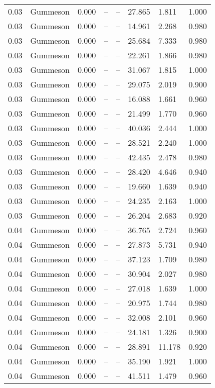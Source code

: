 \begin{table}[H]
\begin{tabular}{l c l l l}
0.03 & Gummeson & 0.000 & -- & -- & 27.865 & 1.811 & 1.000 \\
0.03 & Gummeson & 0.000 & -- & -- & 14.961 & 2.268 & 0.980 \\
0.03 & Gummeson & 0.000 & -- & -- & 25.684 & 7.333 & 0.980 \\
0.03 & Gummeson & 0.000 & -- & -- & 22.261 & 1.866 & 0.980 \\
0.03 & Gummeson & 0.000 & -- & -- & 31.067 & 1.815 & 1.000 \\
0.03 & Gummeson & 0.000 & -- & -- & 29.075 & 2.019 & 0.900 \\
0.03 & Gummeson & 0.000 & -- & -- & 16.088 & 1.661 & 0.960 \\
0.03 & Gummeson & 0.000 & -- & -- & 21.499 & 1.770 & 0.960 \\
0.03 & Gummeson & 0.000 & -- & -- & 40.036 & 2.444 & 1.000 \\
0.03 & Gummeson & 0.000 & -- & -- & 28.521 & 2.240 & 1.000 \\
0.03 & Gummeson & 0.000 & -- & -- & 42.435 & 2.478 & 0.980 \\
0.03 & Gummeson & 0.000 & -- & -- & 28.420 & 4.646 & 0.940 \\
0.03 & Gummeson & 0.000 & -- & -- & 19.660 & 1.639 & 0.940 \\
0.03 & Gummeson & 0.000 & -- & -- & 24.235 & 2.163 & 1.000 \\
0.03 & Gummeson & 0.000 & -- & -- & 26.204 & 2.683 & 0.920 \\
0.04 & Gummeson & 0.000 & -- & -- & 36.765 & 2.724 & 0.960 \\
0.04 & Gummeson & 0.000 & -- & -- & 27.873 & 5.731 & 0.940 \\
0.04 & Gummeson & 0.000 & -- & -- & 37.123 & 1.709 & 0.980 \\
0.04 & Gummeson & 0.000 & -- & -- & 30.904 & 2.027 & 0.980 \\
0.04 & Gummeson & 0.000 & -- & -- & 27.018 & 1.639 & 1.000 \\
0.04 & Gummeson & 0.000 & -- & -- & 20.975 & 1.744 & 0.980 \\
0.04 & Gummeson & 0.000 & -- & -- & 32.008 & 2.101 & 0.960 \\
0.04 & Gummeson & 0.000 & -- & -- & 24.181 & 1.326 & 0.900 \\
0.04 & Gummeson & 0.000 & -- & -- & 28.891 & 11.178 & 0.920 \\
0.04 & Gummeson & 0.000 & -- & -- & 35.190 & 1.921 & 1.000 \\
0.04 & Gummeson & 0.000 & -- & -- & 41.511 & 1.479 & 0.960 \\

\end{tabular}
\end{table}
